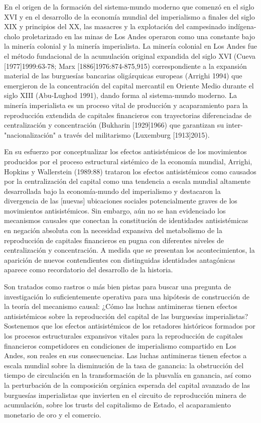\documentclass[]{interact}
\theoremstyle{plain}%
\theoremstyle{definition}
\theoremstyle{remark}
\begin{document}
En el origen de la formación del sistema-mundo moderno que comenzó en el siglo XVI y en el desarrollo de la economía mundial del imperialismo a finales del siglo XIX y principios del XX, las masacres y la explotación del campesinado indígena-cholo proletarizado en las minas de Los Andes operaron como una constante bajo la minería colonial y la minería imperialista. La minería colonial en Los Andes fue el método fundacional de la acumulación original expandida del siglo XVI (Cueva [1977]1999:63-78; Marx [1886]1976:874-875,915) correspondiente a la expansión material de las burguesías bancarias oligárquicas europeas (Arrighi 1994) que emergieron de la concentración del capital mercantil en Oriente Medio durante el siglo XIII (Abu-Lughod 1991), dando forma al sistema-mundo moderno. La minería imperialista es un proceso vital de producción y acaparamiento para la reproducción extendida de capitales financieros con trayectorias diferenciadas de centralización y concentración (Bukharin [1929]1966) que garantizan su inter-"nacionalización" a través del militarismo (Luxemburg [1913]2015). 

En su esfuerzo por conceptualizar los efectos antisistémicos de los movimientos producidos por el proceso estructural sistémico de la economía mundial, Arrighi, Hopkins y Wallerstein (1989:88) trataron los efectos antisistémicos como causados por la centralización del capital como una tendencia a escala mundial altamente desarrollada bajo la economía-mundo del imperialismo y destacaron la divergencia de las [nuevas] ubicaciones sociales potencialmente graves de los movimientos antisistémicos. Sin embargo, aún no se han evidenciado los mecanismos causales que conectan la constitución de identidades antisistémicas en negación absoluta con la necesidad expansiva del metabolismo de la reproducción de capitales financieros en pugna con diferentes niveles de centralización y concentración. A medida que se presentan los acontecimientos, la aparición de nuevos contendientes con distinguidas identidades antagónicas aparece como recordatorio del desarrollo de la historia. 

Son tratados como rastros o más bien pistas para buscar una pregunta de investigación lo suficientemente operativa para una hipótesis de construcción de la teoría del mecanismo causal: ¿Cómo las luchas antimineras tienen efectos antisistémicos sobre la reproducción del capital de las burguesías imperialistas? Sostenemos que los efectos antisistémicos de los retadores históricos formados por los procesos estructurales expansivos vitales para la reproducción de capitales financieros competidores en condiciones de imperialismo compartido en Los Andes, son reales en sus consecuencias. Las luchas antimineras tienen efectos a escala mundial sobre la disminución de la tasa de ganancia: la obstrucción del tiempo de circulación en la transformación de la plusvalía en ganancia, así como la perturbación de la composición orgánica esperada del capital avanzado de las burguesías imperialistas que invierten en el circuito de reproducción minera de acumulación, sobre los trusts del capitalismo de Estado, el acaparamiento monetario de oro y el comercio. 
\end{document}
